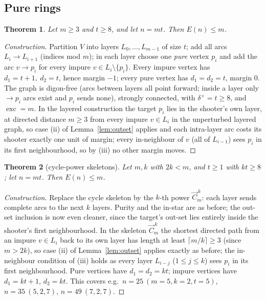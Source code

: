 \documentclass[11pt]{amsart}
\newtheorem{theorem}{Theorem}[section]
\theoremstyle{remark}
\newcommand{\exc}{\operatorname{exc}}
\begin{document}
\subsection{Pure rings}

\begin{theorem}\label{thm:purering}
Let $m \ge 3$ and $t \ge 8$, and let $n = mt$. Then $E(n) \le m$.
\end{theorem}

\begin{proof}[Construction]
Partition $V$ into layers $L_0, \dots, L_{m-1}$ of size $t$; add all arcs
$L_i \to L_{i+1}$ (indices mod $m$); in each layer choose one \emph{pure}
vertex $p_i$ and add the arc $v \to p_i$ for every impure
$v \in L_i \setminus \{p_i\}$. Every impure vertex has
$d_1 = t + 1,\ d_2 = t$, hence margin $-1$; every pure vertex has
$d_1 = d_2 = t$, margin $0$. The graph is digon-free (arcs between layers
all point forward; inside a layer only $\to p_i$ arcs exist and $p_i$ sends
none), strongly connected, with $\delta^+ = t \ge 8$, and $\exc = m$.
In the layered construction the target $p_i$ lies in the shooter's own
layer, at directed distance $m \ge 3$ from every impure $v \in L_i$ in the
unperturbed layered graph, so
case (ii) of Lemma~\ref{lem:outset} applies and each intra-layer arc costs
its shooter exactly one unit of margin; every in-neighbour of $v$ (all of
$L_{i-1}$) sees $p_i$ in its first neighbourhood, so by (iii) no other
margin moves.
\end{proof}

\begin{theorem}[cycle-power skeletons]\label{thm:power}
Let $m, k$ with $2k < m$, and $t \ge 1$ with $kt \ge 8$; let $n = mt$. Then
$E(n) \le m$.
\end{theorem}

\begin{proof}[Construction]
Replace the cycle skeleton by the $k$-th power $\vec{C}_m^{\,k}$: each layer
sends complete arcs to the next $k$ layers. Purity and the in-star are as
before; the out-set inclusion is now even cleaner, since the target's
out-set lies entirely inside the shooter's first neighbourhood. In the
skeleton $\vec{C}_m^{\,k}$ the shortest directed path from an impure
$v \in L_i$ back to its own layer has length at least
$\lceil m/k \rceil \ge 3$ (since $m > 2k$), so case (ii) of
Lemma~\ref{lem:outset} applies exactly as before; the in-neighbour
condition of (iii) holds as every layer $L_{i-j}$ ($1 \le j \le k$) sees
$p_i$ in its first neighbourhood. Pure vertices have $d_1 = d_2 = kt$;
impure vertices have $d_1 = kt + 1$, $d_2 = kt$. This covers e.g.\
$n = 25\ (m{=}5,k{=}2,t{=}5)$, $n = 35\ (5,2,7)$, $n = 49\ (7,2,7)$.
\end{proof}
\end{document}
